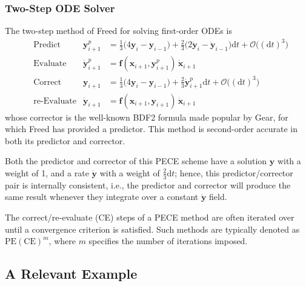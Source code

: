 \subsubsection{Two-Step ODE Solver}

The two-step method of Freed \cite{Freed17a} for solving first-order ODEs is
\begin{subequations}
    \label{1stOrderODEs}
    \begin{align}
    \mbox{} & \text{Predict} & 
    \mathbf{y}_{i+1}^p & = \tfrac{1}{3} 
    \bigl( 4 \mathbf{y}_i - \mathbf{y}_{i-1} \bigr) + 
    \tfrac{2}{3} \bigl( 2 \dot{\mathbf{y}}_i - \dot{\mathbf{y}}_{i-1} 
    \bigr) \mathrm{d}t + \mathcal{O} \bigl( (\mathrm{d}t)^3 \bigr)
    \label{1stOrderPredictor} \\
    \mbox{} & \text{Evaluate} & 
    \dot{\mathbf{y}}^p_{i+1} & = \mathbf{f} (\mathbf{x}_{i+1} , \mathbf{y}_{i+1}^p) \, \dot{\mathbf{x}}_{i+1}
    \label{1stOrderEvaluate} \\
    \mbox{} & \text{Correct} &
    \mathbf{y}_{i+1} & = \tfrac{1}{3} 
    \bigl( 4 \mathbf{y}_i - \mathbf{y}_{i-1} \bigr) + 
    \tfrac{2}{3} \dot{\mathbf{y}}^{p}_{i+1} \mathrm{d}t + 
    \mathcal{O} \bigl( (\mathrm{d}t)^3 \bigr)
    \label{1stOrderCorrector} \\
    \mbox{} & \text{re-Evaluate} & 
    \dot{\mathbf{y}}_{i+1} & = \mathbf{f} (\mathbf{x}_{i+1} , \mathbf{y}_{i+1}) \, 
    \dot{\mathbf{x}}_{i+1}
    \label{1stOrderReEvaluate}
    \end{align}
\end{subequations} 
whose corrector is the well-known BDF2 formula made popular by Gear, for which Freed has provided a predictor.  This method is second-order accurate in both its predictor and corrector.

Both the predictor and corrector of this PECE scheme have a solution $\mathbf{y}$ with a weight of 1, and a rate $\dot{\mathbf{y}}$ with a weight of $\tfrac{2}{3} \mathrm{d}t$; hence, this predictor\slash corrector pair is internally consistent, i.e., the predictor and corrector will produce the same result whenever they integrate over a constant $\dot{\mathbf{y}}$ field. 

The correct\slash re-evaluate (CE) steps of a PECE method are often iterated over until a convergence criterion is satisfied.  Such methods are typically denoted as $\text{PE}(\text{CE})^m$, where $m$ specifies the number of iterations imposed.


\subsection{A Relevant Example}

